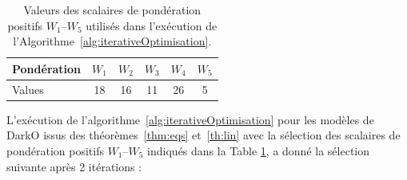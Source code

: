 \begin{table}
    \centering
    \begin{tabular}{|l|c|c|c|c|c|} 
    \hline
    Pondération & $W_1$ & $W_2$ & $W_3$ & $W_4$ & $W_5$ \\ \hline
    Values &18 & 16 & 11 & 26 & 5 \\ \hline
    \end{tabular}
    \caption{\label{tab:W1W5} Valeurs des scalaires de pondération positifs $W_1$--$W_5$ utilisés dans l'exécution de l'Algorithme~\ref{alg:iterativeOptimisation}.}
\end{table}
L'exécution de l'algorithme~\ref{alg:iterativeOptimisation} pour les modèles de DarkO issus des théorèmes~\ref{thm:eqs} et~\ref{th:lin} avec la sélection des scalaires de pondération positifs $W_1$--$W_5$ indiqués dans la Table \ref{tab:W1W5}, a donné la sélection suivante après 2 itérations :
